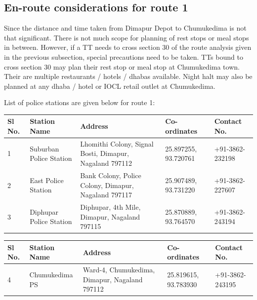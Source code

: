 \documentclass[paper=letter, fontsize=12pt]{article}
\begin{document}
\subsection{En-route considerations for route 1}

Since the distance and time taken from Dimapur Depot to Chumukedima is not that significant. There is not much scope for planning of rest stops or meal stops in between. However, if a TT needs to cross section 30 of the route analysis given in the previous subsection, special precautions need to be taken. TTs bound to cross section 30 may plan their rest stop or meal stop at Chumukedima town. Their are multiple restaurants / hotels / dhabas available. Night halt may also be planned at any dhaba / hotel or IOCL retail outlet at Chumukedima.

List of police stations are given below for route 1:

\vspace{0.2cm}

\begin{tabular}{ |p{0.5cm}|p{2cm}|p{3cm}|p{2cm}|p{1.5cm}|  }
\hline
Sl No. & Station Name & Address & Co-ordinates & Contact No.\\
\hline

1 & Suburban Police Station &  Lhomithi Colony, Signal Bosti, Dimapur, Nagaland 797112 & 25.897255, 93.720761 & +91-3862-232198 \\
\hline

2 & East Police Station &  Bank Colony, Police Colony, Dimapur, Nagaland 797117 & 25.907489, 93.731220 & +91-3862-227607 \\
\hline

3 & Diphupar Police Station &  Diphupar, 4th Mile, Dimapur, Nagaland 797115 & 25.870889, 93.764570 & +91-3862-243194 \\
\hline


\hline
\end{tabular}


\begin{tabular}{ |p{0.5cm}|p{2cm}|p{3cm}|p{2cm}|p{1.5cm}|  }
\hline
Sl No. & Station Name & Address & Co-ordinates & Contact No.\\
\hline

4 & Chumukedima PS &  Ward-4, Chumukedima, Dimapur, Nagaland 797112 & 25.819615, 93.783930 & +91-3862-243195 \\
\hline


\end{tabular}


\vspace{0.5cm}
\end{document}
